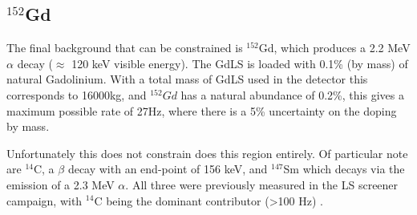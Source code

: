 




\subsection{${}^{152}$Gd}
\par
The final background that can be constrained is ${}^{152}$Gd, which produces a 2.2 MeV $\alpha$ decay ($\approx$ 120 keV visible energy).
The GdLS is loaded with 0.1\% (by mass) of natural Gadolinium.
With a total mass of GdLS used in the detector this corresponds to 16000kg, and ${}^{152}Gd$ has a natural abundance of 0.2\%, this gives a maximum possible rate of 27Hz, where there is a 5\% uncertainty on the doping by mass.
\par
Unfortunately this does not constrain does this region entirely.
Of particular note are ${}^{14}$C, a $\beta$ decay with an end-point of 156 keV, and ${}^{147}$Sm which decays via the emission of a 2.3 MeV $\alpha$.
All three were previously measured in the LS screener campaign, with ${}^{14}$C being the dominant contributor (>100 Hz) \cite{scotthaselschwardt_thesis_ref}.



